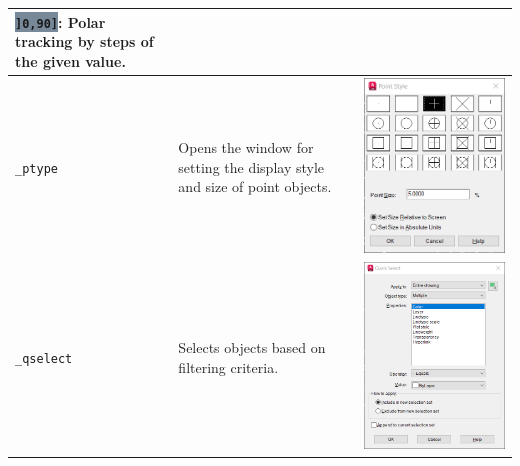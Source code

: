 \documentclass[..]{../IEEEphot}
\newcommand{\param}[1]{\colorbox{LightSlateGray}{\color{Navy}\texttt{\textbf{#1}}}}
\begin{document}
\begin{center}
\begin{longtable}{m{.2\linewidth}m{.33\linewidth}m{.33\linewidth}}
\param{]0,90]}: Polar tracking by steps of the given value.
\\
\midrule
\texttt{\_ptype} & Opens the window for setting the display style and size of point objects.  & \includegraphics[width = 0.8\linewidth, keepaspectratio]{../images/png/_ptype_en.png} 
\\
\midrule
\texttt{\_qselect} & Selects objects based on filtering criteria. & \includegraphics[width = 0.8\linewidth, keepaspectratio]{../images/png/_qselect_en.png} 

\end{longtable}
\end{center}
\end{document}
